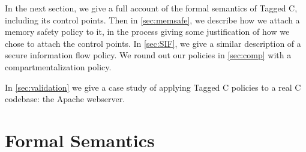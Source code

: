 \documentclass[acmsmall,review,anonymous]{acmart}\settopmatter{printfolios=true,printccs=false,printacmref=false}
\begin{document}
In the next section, we give a full account of the formal semantics of Tagged C,
including its control points. Then in \cref{sec:memsafe}, we describe how we attach
a memory safety policy to it, in the process giving some justification of how we chose to
attach the control points. In \cref{sec:SIF}, we give a similar description of
a secure information flow policy. We round out our policies in \cref{sec:comp} with
a compartmentalization policy.

In \cref{sec:validation} we give a case study of applying Tagged C policies to
a real C codebase: the Apache webserver.

\section{Formal Semantics}
\label{sec:semantics}
\end{document}
